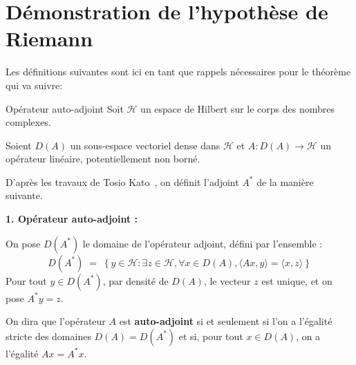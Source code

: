\documentclass[Riemann_Hypothesis.tex]{subfiles}
\begin{document}
\color{red}
\section{Démonstration de l'hypothèse de Riemann}
\color{black}

Les définitions suivantes sont ici en tant que rappels nécessaires
pour le théorème qui va suivre:

\begin{DefNef}[label=df:OperateurAutoAdjointResolvante_fr]{Opérateur auto-adjoint}
    Soit $\mathcal{H}$ un espace de Hilbert sur le corps des nombres complexes. \par
    Soient $D(A)$ un sous-espace vectoriel dense dans $\mathcal{H}$ et $A : D(A) \to \mathcal{H}$ un opérateur linéaire, potentiellement non borné. \par
    D'après les travaux de Tosio Kato~\cite{kato1995_perturbation}, 
    on définit l'adjoint $A^*$ de la manière suivante. \par
    \vspace{0.2cm}
    \textbf{1. Opérateur auto-adjoint :} \par
    On pose $D(A^*)$ le domaine de l'opérateur adjoint, défini par l'ensemble :
    \begin{equation*}
        D(A^*) \;=\; \left\{ y \in \mathcal{H} : \exists z \in \mathcal{H}, \forall x \in D(A), \langle Ax, y \rangle = \langle x, z \rangle \right\}
    \end{equation*}
    Pour tout $y \in D(A^*)$, par densité de $D(A)$, le vecteur $z$ est unique, et on pose $A^*y = z$. \par
    On dira que l'opérateur $A$ est \textbf{auto-adjoint} si et seulement si l'on a l'égalité stricte des domaines $D(A) = D(A^*)$ et si, pour tout $x \in D(A)$, on a l'égalité $Ax = A^*x$. \par
\end{DefNef}
\end{document}
